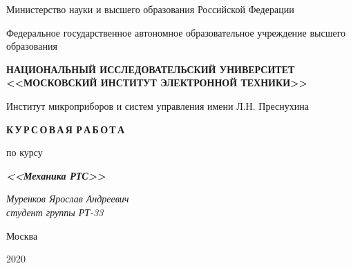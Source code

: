 \thispagestyle{empty}
\setcounter{page}{0}

\begin{center}
    Министерство науки  и высшего образования Российской Федерации
    
    \vspace{1ex}

    Федеральное государственное автономное образовательное учреждение высшего образования
    
    \textbf{НАЦИОНАЛЬНЫЙ ИССЛЕДОВАТЕЛЬСКИЙ УНИВЕРСИТЕТ <<МОСКОВСКИЙ ИНСТИТУТ ЭЛЕКТРОННОЙ ТЕХНИКИ>>}
    
    \vspace{1ex}

    Институт микроприборов и систем управления имени Л.Н. Преснухина
\end{center}

\vspace{13ex}

\begin{center}
    \textbf{К\,У\,Р\,С\,О\,В\,А\,Я Р\,А\,Б\,О\,Т\,А}
    \vspace{1ex}

    по курсу
    
    \textbf{\textit{<<Механика РТС>>}}
\end{center}

\vspace{20ex}

\begin{flushright}
    \noindent
    \textit{Муренков Ярослав Андреевич} \\
    \textit{студент группы РТ-33}
\end{flushright}

\vfill

\begin{center}
    Москва

    2020
\end{center}

\newpage
